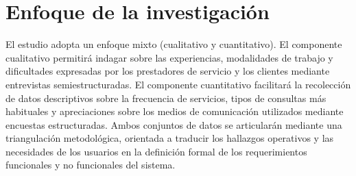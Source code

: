 \section{Enfoque de la investigación}

El estudio adopta un enfoque mixto (cualitativo y cuantitativo). El componente cualitativo permitirá indagar sobre las experiencias, modalidades de trabajo y dificultades expresadas por los prestadores de servicio y los clientes mediante entrevistas semiestructuradas. El componente cuantitativo facilitará la recolección de datos descriptivos sobre la frecuencia de servicios, tipos de consultas más habituales y apreciaciones sobre los medios de comunicación utilizados mediante encuestas estructuradas. Ambos conjuntos de datos se articularán mediante una triangulación metodológica, orientada a traducir los hallazgos operativos y las necesidades de los usuarios en la definición formal de los requerimientos funcionales y no funcionales del sistema.